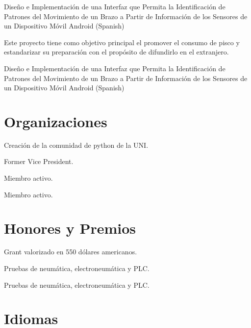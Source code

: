 \documentclass[11pt,a4paper,sans]{moderncv}
\begin{document}
{Diseño e Implementación de una Interfaz que Permita la Identificación de Patrones del Movimiento de un Brazo a Partir de Información de los Sensores de un Dispositivo Móvil Android (Spanish)}  

{Este proyecto tiene como objetivo principal el promover el consumo de pisco y estandarizar su preparación con el propósito de difundirlo en el extranjero.}  

{Diseño e Implementación de una Interfaz que Permita la Identificación de Patrones del Movimiento de un Brazo a Partir de Información de los Sensores de un Dispositivo Móvil Android (Spanish)}  



\section{Organizaciones}
{Creación de la comunidad de python de la UNI.}  

{Former Vice President.}  

{Miembro activo.}  

{Miembro activo.}  



\section{Honores y Premios}
{Grant valorizado en 550 dólares americanos.}

{Pruebas de neumática, electroneumática y PLC.}  

{Pruebas de neumática, electroneumática y PLC.}  

{}  

{}  



\section{Idiomas}




%
\end{document}
